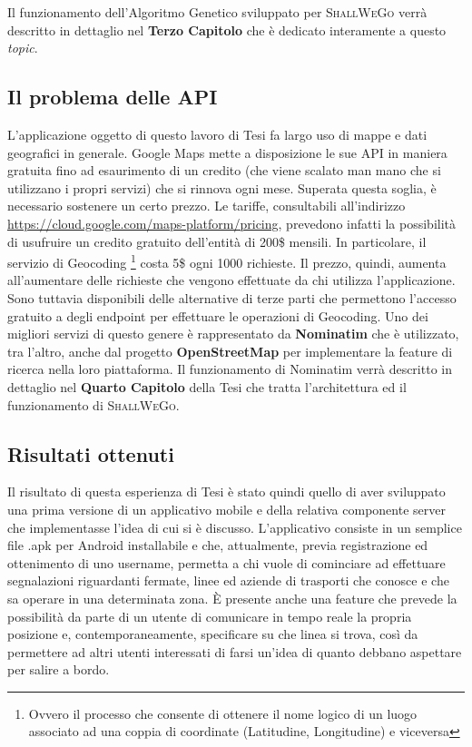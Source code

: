             Il funzionamento dell'Algoritmo Genetico sviluppato per \textsc{ShallWeGo} verrà descritto in dettaglio nel \textbf{Terzo Capitolo} che è dedicato interamente a questo \textit{topic}.

        \subsection{Il problema delle API}
            L'applicazione oggetto di questo lavoro di Tesi fa largo uso di mappe e dati geografici in generale. Google Maps mette a disposizione le sue API in maniera gratuita fino ad esaurimento di un credito (che viene scalato man mano che si utilizzano i propri servizi) che si rinnova ogni mese. Superata questa soglia, è necessario sostenere un certo prezzo.
            Le tariffe, consultabili all'indirizzo \url{https://cloud.google.com/maps-platform/pricing}, prevedono infatti la possibilità di usufruire un credito gratuito dell'entità di 200\$ mensili. In particolare, il servizio di Geocoding \footnote[1]{Ovvero il processo che consente di ottenere il nome logico di un luogo associato ad una coppia di coordinate (Latitudine, Longitudine) e viceversa} costa 5\$ ogni 1000 richieste. Il prezzo, quindi, aumenta all'aumentare delle richieste che vengono effettuate da chi utilizza l'applicazione.
            Sono tuttavia disponibili delle alternative di terze parti che permettono l'accesso gratuito a degli endpoint per effettuare le operazioni di Geocoding. Uno dei migliori servizi di questo genere è rappresentato da \textbf{Nominatim} che è utilizzato, tra l'altro, anche dal progetto \textbf{OpenStreetMap} per implementare la feature di ricerca nella loro piattaforma. Il funzionamento di Nominatim verrà descritto in dettaglio nel \textbf{Quarto Capitolo} della Tesi che tratta l'architettura ed il funzionamento di \textsc{ShallWeGo}.
    
    \subsection{Risultati ottenuti}
        Il risultato di questa esperienza di Tesi è stato quindi quello di aver sviluppato una prima versione di un applicativo mobile e della relativa componente server che implementasse l'idea di cui si è discusso. L'applicativo consiste in un semplice file .apk per Android installabile e che, attualmente, previa registrazione ed ottenimento di uno username, permetta a chi vuole di cominciare ad effettuare segnalazioni riguardanti fermate, linee ed aziende di trasporti che conosce e che sa operare in una determinata zona.
        È presente anche una feature che prevede la possibilità da parte di un utente di comunicare in tempo reale la propria posizione e, contemporaneamente, specificare su che linea si trova, così da permettere ad altri utenti interessati di farsi un'idea di quanto debbano aspettare per salire a bordo.
        
